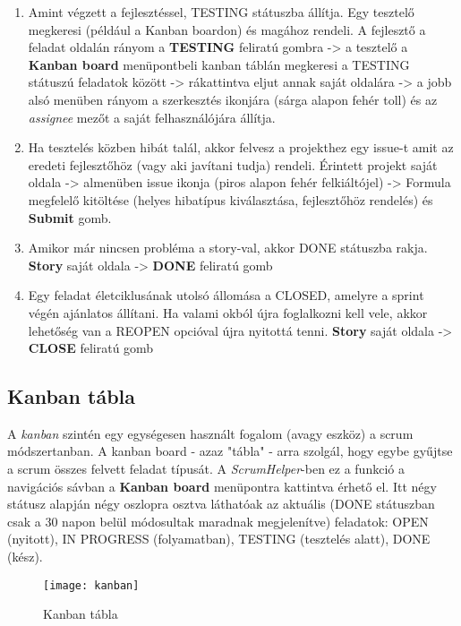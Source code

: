 \begin{enumerate}
	\item Amint végzett a fejlesztéssel, TESTING státuszba állítja. Egy tesztelő megkeresi (például a Kanban boardon) és magához rendeli. A fejlesztő a feladat oldalán rányom a \textbf{TESTING} feliratú gombra -> a tesztelő a \textbf{Kanban board} menüpontbeli kanban táblán megkeresi a TESTING státuszú feladatok között -> rákattintva eljut annak saját oldalára -> a jobb alsó menüben rányom a szerkesztés ikonjára (sárga alapon fehér toll) és az \textit{assignee} mezőt a saját felhasználójára állítja.
	\item Ha tesztelés közben hibát talál, akkor felvesz a projekthez egy issue-t amit az eredeti fejlesztőhöz (vagy aki javítani tudja) rendeli. Érintett projekt saját oldala -> almenüben issue ikonja (piros alapon fehér felkiáltójel) -> Formula megfelelő kitöltése (helyes hibatípus kiválasztása, fejlesztőhöz rendelés) és \textbf{Submit} gomb.
	\item Amikor már nincsen probléma a story-val, akkor DONE státuszba rakja. \textbf{Story} saját oldala -> \textbf{DONE} feliratú gomb
	\item Egy feladat életciklusának utolsó állomása a CLOSED, amelyre a sprint végén ajánlatos állítani. Ha valami okból újra foglalkozni kell vele, akkor lehetőség van a REOPEN opcióval újra nyitottá tenni. \textbf{Story} saját oldala -> \textbf{CLOSE} feliratú gomb
\end{enumerate}

\subsection{Kanban tábla}
\label{kanbanboard}

A \textit{kanban} szintén egy egységesen használt fogalom (avagy eszköz) a scrum módszertanban. A kanban board - azaz "tábla" - arra szolgál, hogy egybe gyűjtse a scrum összes felvett feladat típusát. A \textit{ScrumHelper}-ben ez a funkció a navigációs sávban a \textbf{Kanban board} menüpontra kattintva érhető el. Itt négy státusz alapján négy oszlopra osztva láthatóak az aktuális (DONE státuszban csak a 30 napon belül módosultak maradnak megjelenítve) feladatok: OPEN (nyitott), IN PROGRESS (folyamatban), TESTING (tesztelés alatt), DONE (kész).

\begin{figure}[H]
	\centering
	\texttt{[image: kanban]}
	\caption{Kanban tábla}
	\label{fig:kanban}
\end{figure}

